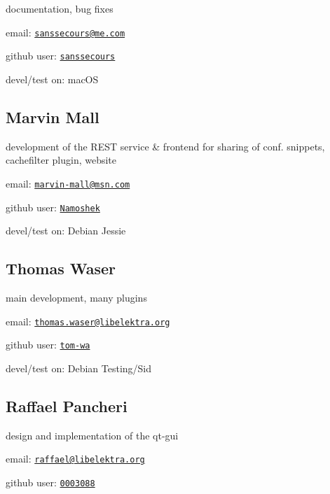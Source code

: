 documentation, bug fixes


\begin{DoxyItemize}
\item email\+: \href{mailto:sanssecours@me.com}{\tt sanssecours@me.\+com}
\item github user\+: \href{http://github.com/sanssecours}{\tt sanssecours}
\item devel/test on\+: mac\+OS
\end{DoxyItemize}

\subsection*{Marvin Mall}

development of the R\+E\+ST service \& frontend for sharing of conf. snippets, cachefilter plugin, website


\begin{DoxyItemize}
\item email\+: \href{mailto:marvin-mall@msn.com}{\tt marvin-\/mall@msn.\+com}
\item github user\+: \href{https://github.com/Namoshek}{\tt Namoshek}
\item devel/test on\+: Debian Jessie
\end{DoxyItemize}

\subsection*{Thomas Waser}

main development, many plugins


\begin{DoxyItemize}
\item email\+: \href{mailto:thomas.waser@libelektra.org}{\tt thomas.\+waser@libelektra.\+org}
\item github user\+: \href{https://github.com/tom-wa}{\tt tom-\/wa}
\item devel/test on\+: Debian Testing/\+Sid
\end{DoxyItemize}

\subsection*{Raffael Pancheri}

design and implementation of the qt-\/gui


\begin{DoxyItemize}
\item email\+: \href{mailto:raffael@libelektra.org}{\tt raffael@libelektra.\+org}
\item github user\+: \href{https://github.com/0003088}{\tt 0003088}
\end{DoxyItemize}

